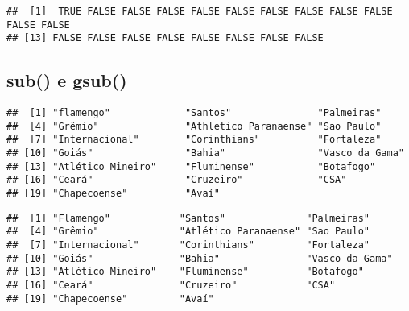 \documentclass[
]{book}
\newenvironment{Shaded}{\begin{snugshade}}{\end{snugshade}}
\newcommand{\CommentTok}[1]{\textcolor[rgb]{0.56,0.35,0.01}{\textit{#1}}}
\newcommand{\FloatTok}[1]{\textcolor[rgb]{0.00,0.00,0.81}{#1}}
\newcommand{\FunctionTok}[1]{\textcolor[rgb]{0.00,0.00,0.00}{#1}}
\newcommand{\NormalTok}[1]{#1}
\newcommand{\SpecialCharTok}[1]{\textcolor[rgb]{0.00,0.00,0.00}{#1}}
\newcommand{\StringTok}[1]{\textcolor[rgb]{0.31,0.60,0.02}{#1}}
\begin{document}
\begin{verbatim}
##  [1]  TRUE FALSE FALSE FALSE FALSE FALSE FALSE FALSE FALSE FALSE FALSE FALSE
## [13] FALSE FALSE FALSE FALSE FALSE FALSE FALSE FALSE
\end{verbatim}

\hypertarget{sub-e-gsub}{%
\subsection{sub() e gsub()}\label{sub-e-gsub}}

\begin{Shaded}
\end{Shaded}

\begin{verbatim}
##  [1] "flamengo"             "Santos"               "Palmeiras"           
##  [4] "Grêmio"               "Athletico Paranaense" "Sao Paulo"           
##  [7] "Internacional"        "Corinthians"          "Fortaleza"           
## [10] "Goiás"                "Bahia"                "Vasco da Gama"       
## [13] "Atlético Mineiro"     "Fluminense"           "Botafogo"            
## [16] "Ceará"                "Cruzeiro"             "CSA"                 
## [19] "Chapecoense"          "Avaí"
\end{verbatim}

\begin{Shaded}
\end{Shaded}

\begin{verbatim}
##  [1] "Flamengo"            "Santos"              "Palmeiras"          
##  [4] "Grêmio"              "Atlético Paranaense" "Sao Paulo"          
##  [7] "Internacional"       "Corinthians"         "Fortaleza"          
## [10] "Goiás"               "Bahia"               "Vasco da Gama"      
## [13] "Atlético Mineiro"    "Fluminense"          "Botafogo"           
## [16] "Ceará"               "Cruzeiro"            "CSA"                
## [19] "Chapecoense"         "Avaí"
\end{verbatim}
\end{document}
